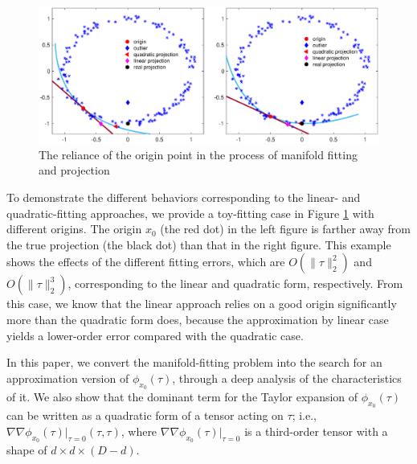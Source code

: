 \documentclass{article}
\theoremstyle{remark}
\begin{document}
\begin{figure}[t!] %
   \centering
   \includegraphics[width=\linewidth]{democ3.eps} 
   \vspace{-0.4cm}
   \caption{The reliance of the origin point in the process of manifold fitting and projection}
   \label{Comparison}
\end{figure}
To demonstrate the different behaviors corresponding to the linear- and quadratic-fitting approaches, we provide a toy-fitting case in Figure \ref{Comparison} with different origins. The origin $x_0$ (the red dot) in the left figure is farther away from the true projection (the black dot) than that in the right figure.  This example shows the effects of the different fitting errors, which are $O(\|\tau\|_2^2)$ and $O(\|\tau\|_2^3)$, corresponding to the linear and quadratic form, respectively. From this case, we know that the linear approach relies on a good origin significantly more than the quadratic form does, because the approximation by linear case yields a lower-order error compared with the quadratic case.
 

In this paper, we convert the manifold-fitting problem into the search for an approximation version of $\phi_{x_0}(\tau)$, through a deep analysis of the characteristics of it. We also show that the dominant term for the Taylor expansion of $\phi_{x_0}(\tau)$ can be written as a quadratic form of a tensor acting on $\tau$; i.e., $\nabla\nabla \phi_{x_0}(\tau)|_{\tau=0}(\tau,\tau)$, where $\nabla\nabla\phi_{x_0}(\tau)|_{\tau=0}$ is a third-order tensor with a shape of $d\times d\times (D-d)$.  
\end{document}
